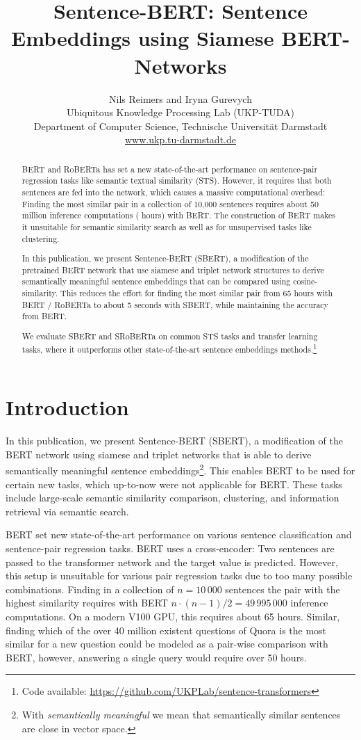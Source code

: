 \documentclass[11pt,a4paper]{article}
\title{Sentence-BERT: Sentence Embeddings using Siamese BERT-Networks}
\author{Nils Reimers and Iryna Gurevych \\
Ubiquitous Knowledge Processing Lab (UKP-TUDA)\\
Department of Computer Science, Technische Universit\"at Darmstadt\\
\url{www.ukp.tu-darmstadt.de}}
\date{}
\begin{document}
\maketitle
\begin{abstract}
BERT \cite{devlin2018bert} and RoBERTa  \cite{roberta} has set a new state-of-the-art performance on sentence-pair regression tasks like semantic textual similarity (STS). However, it requires that both sentences are fed into the network, which causes a massive computational overhead: Finding the most similar pair in a collection of 10,000 sentences requires about 50 million inference computations ( hours) with BERT. The construction of BERT makes it unsuitable for semantic similarity search as well as for unsupervised tasks like clustering. 

In this publication, we present Sentence-BERT (SBERT), a modification of the pretrained BERT network that use siamese and triplet network structures to derive semantically meaningful sentence embeddings that can be compared using cosine-similarity. This reduces the effort for finding the most similar pair from 65 hours with BERT / RoBERTa to about 5 seconds with SBERT, while maintaining the accuracy from BERT.

We evaluate SBERT and SRoBERTa on common STS tasks and transfer learning tasks, where it outperforms other state-of-the-art sentence embeddings methods.\footnote{Code available: \url{https://github.com/UKPLab/sentence-transformers}}
\end{abstract}



\section{Introduction}
In this publication, we present Sentence-BERT (SBERT), a modification of the BERT network using siamese and triplet networks that is able to derive semantically meaningful sentence embeddings\footnote{With \textit{semantically meaningful} we mean that semantically similar sentences are close in vector space.}. This enables BERT to be used for certain new tasks, which up-to-now were not applicable for BERT. These tasks include large-scale semantic similarity comparison, clustering, and information retrieval via semantic search.



BERT set new state-of-the-art performance on various sentence classification and sentence-pair regression tasks. BERT uses a cross-encoder: Two sentences are passed to the transformer network and the target value is predicted. However, this setup is unsuitable for various pair regression tasks due to too many possible combinations. Finding in a collection of $n=10\,000$ sentences the pair with the highest similarity requires with BERT $n\cdot(n-1)/2=49\,995\,000$ inference computations. On a modern  V100 GPU, this requires about 65 hours. Similar, finding which of the over 40 million existent questions of Quora is the most similar for a new question could be modeled as a pair-wise comparison with BERT, however, answering a single query would require over 50 hours.
\end{document}
